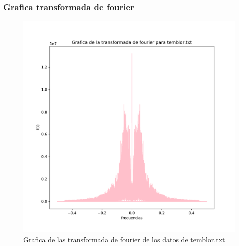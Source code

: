 \documentclass[11pt,letterpaper]{exam}
\begin{document}
\subsubsection{Grafica transformada de fourier}
\begin{figure}[H]
    \centering
    \includegraphics[width=1.1\textwidth]{Fourier_temblor.pdf}
    \caption{Grafica de las transformada de fourier de los datos de temblor.txt}
    \label{fig:my_label}

\end{figure}
\end{document}
